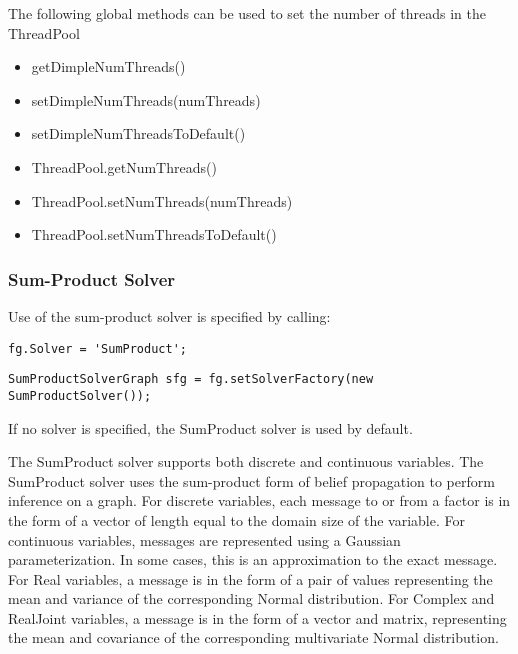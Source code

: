 The following global methods can be used to set the number of threads in the ThreadPool

\ifmatlab
\begin{itemize}
\item getDimpleNumThreads()
\item setDimpleNumThreads(numThreads)
\item setDimpleNumThreadsToDefault()
\end{itemize}
\fi

\ifjava
\begin{itemize}
\item ThreadPool.getNumThreads()
\item ThreadPool.setNumThreads(numThreads)
\item ThreadPool.setNumThreadsToDefault()
\end{itemize}
\fi

\clearpage
\subsubsection{Sum-Product Solver}
\label{sec:SumProductSolver}

Use of the sum-product solver is specified by calling:

\ifmatlab
\begin{lstlisting}
fg.Solver = 'SumProduct';
\end{lstlisting}
\fi

\ifjava
\begin{lstlisting}
SumProductSolverGraph sfg = fg.setSolverFactory(new SumProductSolver());
\end{lstlisting}
\fi

If no solver is specified, the SumProduct solver is used by default.

The SumProduct solver supports both discrete and continuous variables.  The SumProduct solver uses the sum-product form of belief propagation to perform inference on a graph.  For discrete variables, each message to or from a factor is in the form of a vector of length equal to the domain size of the variable.  For continuous variables, messages are represented using a Gaussian parameterization.  In some cases, this is an approximation to the exact message.  For Real variables, a message is in the form of a pair of values representing the mean and variance of the corresponding Normal distribution.  For Complex and RealJoint variables, a message is in the form of a vector and matrix, representing the mean and covariance of the corresponding multivariate Normal distribution.

